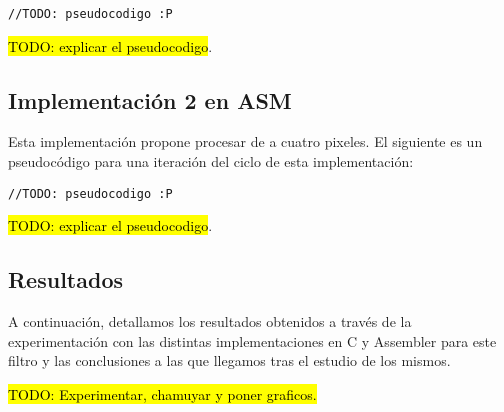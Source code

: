 \begin{lstlisting}
//TODO: pseudocodigo :P
\end{lstlisting}

\hl{TODO: explicar el pseudocodigo}.


\subsection{Implementación 2 en ASM}
Esta implementación propone procesar de a cuatro pixeles.
El siguiente es un pseudocódigo para una iteración del ciclo de esta implementación:

\begin{lstlisting}
//TODO: pseudocodigo :P
\end{lstlisting}

\hl{TODO: explicar el pseudocodigo}.


\subsection{Resultados}
A continuación, detallamos los resultados obtenidos a través de la experimentación con las distintas implementaciones en C y Assembler para este filtro y las conclusiones a las que llegamos tras el estudio de los mismos.

\hl{TODO: Experimentar, chamuyar y poner graficos.}